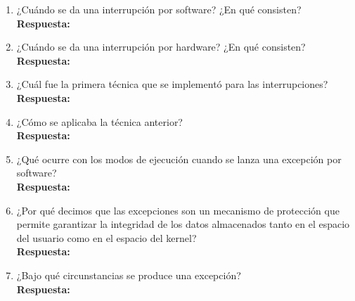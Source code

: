 \documentclass[a4paper,12pt]{article}
\begin{document}
\begin{enumerate}[label=\textbf{Pregunta \arabic*.}]
    \item ¿Cuándo se da una interrupción por software? ¿En qué consisten? \\
    \textbf{Respuesta:} 
    

    \item ¿Cuándo se da una interrupción por hardware? ¿En qué consisten? \\
    \textbf{Respuesta:} 
    

    \item ¿Cuál fue la primera técnica que se implementó para las interrupciones? \\
    \textbf{Respuesta:} 
    

    \item ¿Cómo se aplicaba la técnica anterior? \\
    \textbf{Respuesta:} 
    

    \item ¿Qué ocurre con los modos de ejecución cuando se lanza una excepción por software? \\
    \textbf{Respuesta:} 
    

    \item ¿Por qué decimos que las excepciones son un mecanismo de protección que permite garantizar la integridad de los datos almacenados tanto en el espacio del usuario como en el espacio del kernel? \\
    \textbf{Respuesta:} 
    

    \item ¿Bajo qué circunstancias se produce una excepción? \\
    \textbf{Respuesta:} 
    



\end{enumerate}
\end{document}
